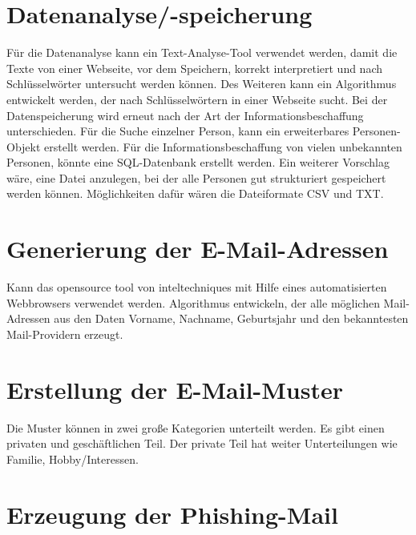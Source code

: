 \section{Datenanalyse/-speicherung}
Für die Datenanalyse kann ein Text-Analyse-Tool verwendet werden, damit die Texte von einer Webseite, vor dem Speichern, korrekt interpretiert und nach Schlüsselwörter untersucht werden können. Des Weiteren kann ein Algorithmus entwickelt werden, der nach Schlüsselwörtern in einer Webseite sucht.%
Bei der Datenspeicherung wird erneut nach der Art der Informationsbeschaffung unterschieden. Für die Suche einzelner Person, kann ein erweiterbares Personen-Objekt erstellt werden. Für die Informationsbeschaffung von vielen unbekannten Personen, könnte eine SQL-Datenbank erstellt werden. Ein weiterer Vorschlag wäre, eine Datei anzulegen, bei der alle Personen gut strukturiert gespeichert werden können. Möglichkeiten dafür wären die Dateiformate CSV und TXT.

\section{Generierung der E-Mail-Adressen}
Kann das opensource tool von inteltechniques mit Hilfe eines automatisierten Webbrowsers verwendet werden. Algorithmus entwickeln, der alle möglichen Mail-Adressen aus den Daten Vorname, Nachname, Geburtsjahr und den bekanntesten Mail-Providern erzeugt.

\section{Erstellung der E-Mail-Muster}
Die Muster können in zwei große Kategorien unterteilt werden. Es gibt einen privaten und geschäftlichen Teil. Der private Teil hat weiter Unterteilungen wie Familie, Hobby/Interessen.
\section{Erzeugung der Phishing-Mail}
